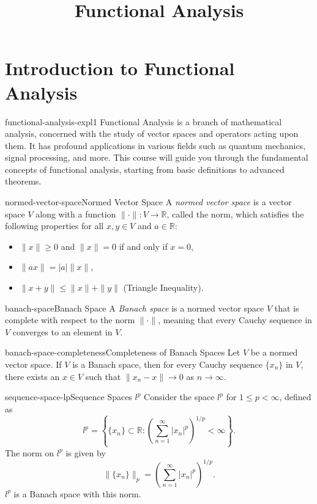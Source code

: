 \documentclass[preview]{standalone}
\begin{document}
\title{Functional Analysis}
\genpage

\section{Introduction to Functional Analysis}

\begin{snippet}{functional-analysis-expl1}
    Functional Analysis is a branch of mathematical analysis, concerned with the study of vector spaces and operators acting upon them. It has profound applications in various fields such as quantum mechanics, signal processing, and more. This course will guide you through the fundamental concepts of functional analysis, starting from basic definitions to advanced theorems.
\end{snippet}

\begin{snippetdefinition}{normed-vector-space}{Normed Vector Space}
    A \textit{normed vector space} is a vector space \(V\) along with a function \(\|\cdot\|: V \to \mathbb{R}\), called the norm, which satisfies the following properties for all \(x, y \in V\) and \(a \in \mathbb{R}\):
    \begin{itemize}
        \item \(\|x\| \geq 0\) and \(\|x\| = 0\) if and only if \(x = 0\),
        \item \(\|ax\| = |a|\|x\|\),
        \item \(\|x + y\| \leq \|x\| + \|y\|\) (Triangle Inequality).
    \end{itemize}
\end{snippetdefinition}

\begin{snippetdefinition}{banach-space}{Banach Space}
    A \textit{Banach space} is a normed vector space \(V\) that is complete with respect to the norm \(\|\cdot\|\), meaning that every Cauchy sequence in \(V\) converges to an element in \(V\).
\end{snippetdefinition}

\begin{snippettheorem}{banach-space-completeness}{Completeness of Banach Spaces}
    Let \(V\) be a normed vector space. If \(V\) is a Banach space, then for every Cauchy sequence \(\{x_n\}\) in \(V\), there exists an \(x \in V\) such that \(\|x_n - x\| \to 0\) as \(n \to \infty\).
\end{snippettheorem}

\begin{snippetexample}{sequence-space-lp}{Sequence Spaces \(l^p\)}
    Consider the space \(l^p\) for \(1 \leq p < \infty\), defined as
    \[
        l^p = \left\{ \{x_n\} \subset \mathbb{R} : \left( \sum_{n=1}^{\infty} |x_n|^p \right)^{1/p} < \infty \right\}.
    \]
    The norm on \(l^p\) is given by
    \[
        \|\{x_n\}\|_p = \left( \sum_{n=1}^{\infty} |x_n|^p \right)^{1/p}.
    \]
    \(l^p\) is a Banach space with this norm.
\end{snippetexample}
\end{document}
